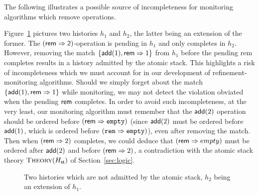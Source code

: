 The following illustrates a possible source of incompleteness for monitoring
algorithms which remove operations.

\begin{example}
  \label{ex:removal_no_saturation}

  Figure~\ref{fig:removal_no_saturation} pictures two histories $h_1$ and
  $h_2$, the latter being an extension of the former. The $(\sf rem \Rightarrow
  2)$-operation is pending in $h_1$ and only completes in $h_2$. However,
  removing the match ${\{ {\sf add}(1), {\sf rem} \Rightarrow 1 \}}$ from $h_1$
  before the pending {\sf rem} completes results in a history admitted by the
  atomic stack. This highlights a risk of incompleteness which we must account
  for in our development of refinement-monitoring algorithms. Should we simply
  forget about the match ${\{  {\sf add}(1), {\sf rem} \Rightarrow 1 \}}$ while
  monitoring, we may not detect the violation obviated when the pending ${\sf
  rem}$ completes. In order to avoid such incompleteness, at the very least,
  our monitoring algorithm must remember that the ${\sf add}(2)$ operation
  should be ordered before $({\sf rem} \Rightarrow {\tt empty})$ (since ${\sf
  add}(2)$ must be ordered before ${\sf add}(1)$, which is ordered before
  $({\tt rem} \Rightarrow {\tt empty})$), even after removing the match. Then
  when $({\sf rem} \Rightarrow 2)$ completes, we could deduce that $({\sf rem}
  \Rightarrow empty)$ must be ordered after ${\sf add}(2)$ and before $({\sf
  rem} \Rightarrow 2)$, a contradiction with the atomic stack theory
  $\textsc{Theory}(H_{\sf st})$ of Section~\ref{sec:logic}.

\end{example}

\begin{figure}
  
  \caption{Two histories which are not admitted by the atomic stack, $h_2$
  being an extension of $h_1$.}
  \label{fig:removal_no_saturation}
\end{figure}
